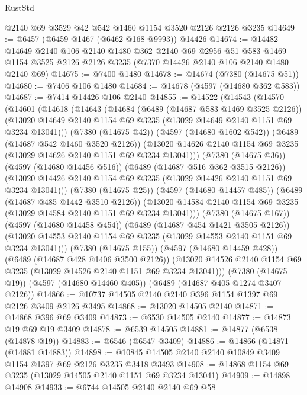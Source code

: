 \begin{lexlean}{RustStd}
\begin{coremodule}
    @2140
    @69
    @3529
    @42
    @542
    @1460
    @1154
    @3520
    @2126
    @2126
    @3235
@14649 := @6457 (@6459 @1467 (@6462 @168 @9993)) @14426
@14674 := @14482
    @14649
    @2140
    @106
    @2140
    @1480
    @362
    @2140
    @69
    @2956
    @51
    @583
    @1469
    @1154
    @3525
    @2126
    @2126
    @3235
    (@7370 @14426 @2140 @106 @2140 @1480 @2140 @69)
@14675 := @7400 @1480
@14678 := @14674 (@7380 (@14675 @51))
@14680 := @7406 @106 @1480
@14684 := @14678 (@4597 (@14680 @362 @583))
@14687 := @7414 @14426 @106 @2140
@14855 := @14522
    (@14543
      (@14570
        (@14601
          (@14618
            (@14643
              (@14684
                (@6489 (@14687 @583 @1469 @3525 @2126))
                (@13020 @14649 @2140 @1154 @69 @3235 (@13029 @14649 @2140 @1151 @69 @3234 @13041)))
              (@7380 (@14675 @42))
              (@4597 (@14680 @1602 @542))
              (@6489 (@14687 @542 @1460 @3520 @2126))
              (@13020 @14626 @2140 @1154 @69 @3235 (@13029 @14626 @2140 @1151 @69 @3234 @13041)))
            (@7380 (@14675 @36))
            (@4597 (@14680 @14456 @516))
            (@6489 (@14687 @516 @362 @3515 @2126))
            (@13020 @14426 @2140 @1154 @69 @3235 (@13029 @14426 @2140 @1151 @69 @3234 @13041)))
          (@7380 (@14675 @25))
          (@4597 (@14680 @14457 @485))
          (@6489 (@14687 @485 @1442 @3510 @2126))
          (@13020 @14584 @2140 @1154 @69 @3235 (@13029 @14584 @2140 @1151 @69 @3234 @13041)))
        (@7380 (@14675 @167))
        (@4597 (@14680 @14458 @454))
        (@6489 (@14687 @454 @1421 @3505 @2126))
        (@13020 @14553 @2140 @1154 @69 @3235 (@13029 @14553 @2140 @1151 @69 @3234 @13041)))
      (@7380 (@14675 @155))
      (@4597 (@14680 @14459 @428))
      (@6489 (@14687 @428 @1406 @3500 @2126))
      (@13020 @14526 @2140 @1154 @69 @3235 (@13029 @14526 @2140 @1151 @69 @3234 @13041)))
    (@7380 (@14675 @19))
    (@4597 (@14680 @14460 @405))
    (@6489 (@14687 @405 @1274 @3407 @2126))
@14866 := @10737 @14505 @2140 @2140 @396 @1154 @1397 @69 @2126 @3409 @2126 @3495
@14868 := @13020 @14505 @2140
@14871 := @14868 @396 @69 @3409
@14873 := @6530 @14505 @2140
@14877 := @14873 @19 @69 @19 @3409
@14878 := @6539 @14505
@14881 := @14877 (@6538 (@14878 @19))
@14883 := @6546 (@6547 @3409)
@14886 := @14866 (@14871 (@14881 @14883))
@14898 := @10845 @14505 @2140 @2140 @10849 @3409 @1154 @1397 @69 @2126 @3235 @3418 @3493
@14908 := @14868 @1154 @69 @3235 (@13029 @14505 @2140 @1151 @69 @3234 @13041)
@14909 := @14898 @14908
@14933 := @6744
    @14505
    @2140
    @2140
    @69
    @58

\end{coremodule}
\end{lexlean}
